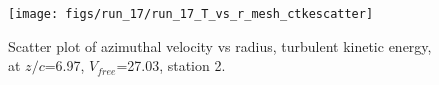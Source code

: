 \begin{figure}[H]
\centering
\texttt{[image: figs/run\_17/run\_17\_T\_vs\_r\_mesh\_ctkescatter]}
\caption{Scatter plot of azimuthal velocity vs radius, turbulent kinetic energy, at $z/c$=6.97, $V_{free}$=27.03, station 2.}
\label{fig:run_17_T_vs_r_mesh_ctkescatter}
\end{figure}


